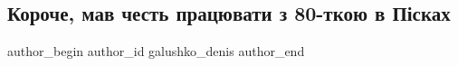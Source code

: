 
 
 
 
 

\subsection{Короче, мав честь працювати з 80-ткою в Пісках}
\label{sec:13_10_2022.fb.galushko_denis.1.koroche__mav_chest_p}

\ifcmt
 author_begin
   author_id galushko_denis
 author_end
\fi
